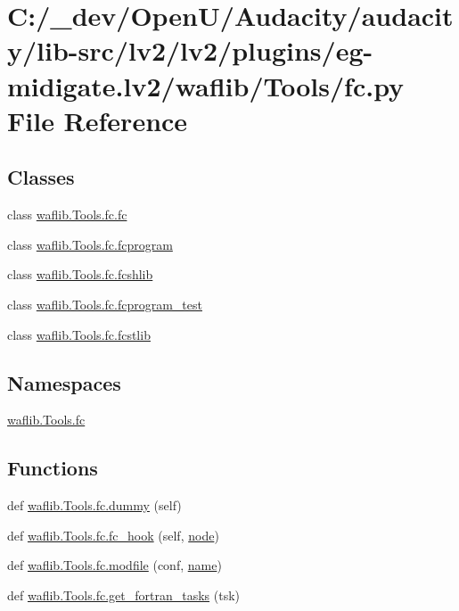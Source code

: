 \hypertarget{lv2_2plugins_2eg-midigate_8lv2_2waflib_2_tools_2fc_8py}{}\section{C\+:/\+\_\+dev/\+Open\+U/\+Audacity/audacity/lib-\/src/lv2/lv2/plugins/eg-\/midigate.lv2/waflib/\+Tools/fc.py File Reference}
\label{lv2_2plugins_2eg-midigate_8lv2_2waflib_2_tools_2fc_8py}
\subsection*{Classes}
\begin{DoxyCompactItemize}
\item 
class \hyperlink{classwaflib_1_1_tools_1_1fc_1_1fc}{waflib.\+Tools.\+fc.\+fc}
\item 
class \hyperlink{classwaflib_1_1_tools_1_1fc_1_1fcprogram}{waflib.\+Tools.\+fc.\+fcprogram}
\item 
class \hyperlink{classwaflib_1_1_tools_1_1fc_1_1fcshlib}{waflib.\+Tools.\+fc.\+fcshlib}
\item 
class \hyperlink{classwaflib_1_1_tools_1_1fc_1_1fcprogram__test}{waflib.\+Tools.\+fc.\+fcprogram\+\_\+test}
\item 
class \hyperlink{classwaflib_1_1_tools_1_1fc_1_1fcstlib}{waflib.\+Tools.\+fc.\+fcstlib}
\end{DoxyCompactItemize}
\subsection*{Namespaces}
\begin{DoxyCompactItemize}
\item 
 \hyperlink{namespacewaflib_1_1_tools_1_1fc}{waflib.\+Tools.\+fc}
\end{DoxyCompactItemize}
\subsection*{Functions}
\begin{DoxyCompactItemize}
\item 
def \hyperlink{namespacewaflib_1_1_tools_1_1fc_a27d355b521fb9e2bf9fa51b4c5b86a75}{waflib.\+Tools.\+fc.\+dummy} (self)
\item 
def \hyperlink{namespacewaflib_1_1_tools_1_1fc_a32c4c535596617f7d93fadd0607f18eb}{waflib.\+Tools.\+fc.\+fc\+\_\+hook} (self, \hyperlink{structnode}{node})
\item 
def \hyperlink{namespacewaflib_1_1_tools_1_1fc_ae8fd3a39f47bdf4cb2e5d16cbdacd4e0}{waflib.\+Tools.\+fc.\+modfile} (conf, \hyperlink{lib_2expat_8h_a1b49b495b59f9e73205b69ad1a2965b0}{name})
\item 
def \hyperlink{namespacewaflib_1_1_tools_1_1fc_a042f42940a7e5040b3d6e9c3dd3df7f4}{waflib.\+Tools.\+fc.\+get\+\_\+fortran\+\_\+tasks} (tsk)
\end{DoxyCompactItemize}
